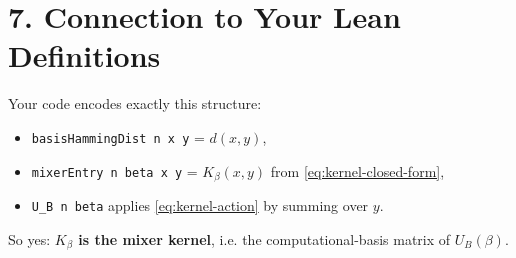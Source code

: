 \documentclass[11pt]{article}
\begin{document}
	\section*{7. Connection to Your Lean Definitions}
	Your code encodes exactly this structure:
	\begin{itemize}
		\item \texttt{basisHammingDist n x y} = $d(x,y)$,
		\item \texttt{mixerEntry n beta x y} = $K_\beta(x,y)$ from \eqref{eq:kernel-closed-form},
		\item \texttt{U\_B n beta} applies \eqref{eq:kernel-action} by summing over $y$.
	\end{itemize}
	So yes: \textbf{$K_\beta$ is the mixer kernel}, i.e. the computational-basis matrix of $U_B(\beta)$.
	
\end{document}
